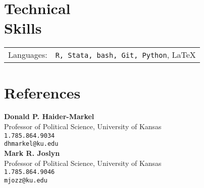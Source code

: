 \documentclass[margin,line,pifont,palatino,courier]{res}
\begin{document}
\begin{resume}

\section{\sc Technical \\ Skills}

\begin{tabular}{@{}p{0.8in}p{6in}}

Languages:& \verb+R, Stata, bash, Git, Python+, \LaTeX   \\

\end{tabular}









\section{\sc References}

\textbf{Donald P. Haider-Markel} \\
Professor of Political Science, University of Kansas \\
\verb+1.785.864.9034+\\
\texttt{dhmarkel@ku.edu}\\

\textbf{Mark R. Joslyn} \\
Professor of Political Science, University of Kansas \\
\verb+1.785.864.9046+\\
\texttt{mjozz@ku.edu}\\


\end{resume}
\end{document}

